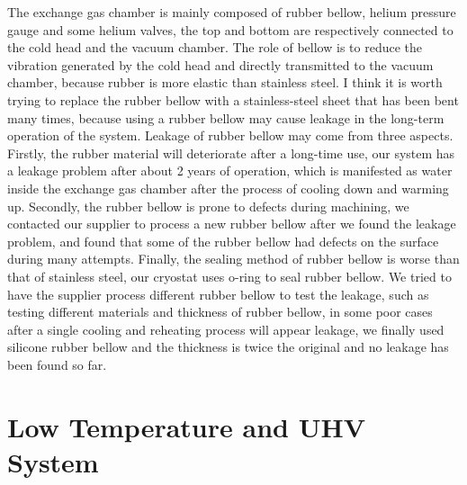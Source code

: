 The exchange gas chamber is mainly composed of rubber bellow, helium pressure gauge and some helium valves, the top and bottom are respectively connected to the cold head and the vacuum chamber. The role of bellow is to reduce the vibration generated by the cold head and directly transmitted to the vacuum chamber, because rubber is more elastic than stainless steel. I think it is worth trying to replace the rubber bellow with a stainless-steel sheet that has been bent many times, because using a rubber bellow may cause leakage in the long-term operation of the system. Leakage of rubber bellow may come from three aspects. Firstly, the rubber material will deteriorate after a long-time use, our system has a leakage problem after about 2 years of operation, which is manifested as water inside the exchange gas chamber after the process of cooling down and warming up. Secondly, the rubber bellow is prone to defects during machining, we contacted our supplier to process a new rubber bellow after we found the leakage problem, and found that some of the rubber bellow had defects on the surface during many attempts. Finally, the sealing method of rubber bellow is worse than that of stainless steel, our cryostat uses o-ring to seal rubber bellow. We tried to have the supplier process different rubber bellow to test the leakage, such as testing different materials and thickness of rubber bellow, in some poor cases after a single cooling and reheating process will appear leakage, we finally used silicone rubber bellow and the thickness is twice the original and no leakage has been found so far.



\section{Low Temperature and UHV System}

